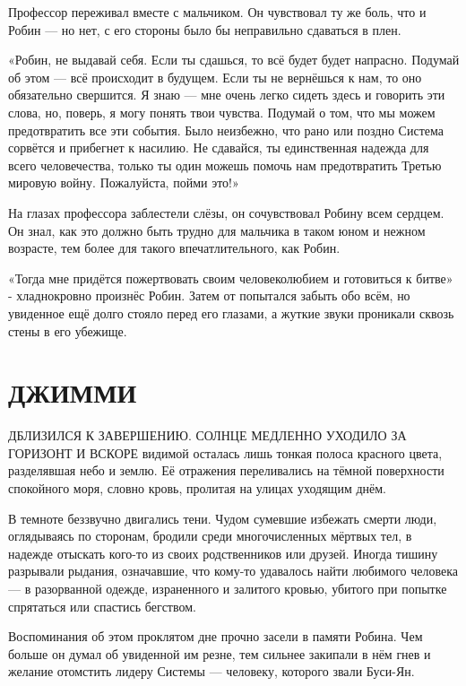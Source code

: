 \documentclass[a5paper, 9pt,
final, openany, twoside=true]{memoir}
\begin{document}
Профессор переживал вместе с мальчиком. Он чувствовал ту же боль, что и Робин — но нет, с его стороны было бы неправильно сдаваться в плен.

«Робин, не выдавай себя. Если ты сдашься, то всё будет будет напрасно. Подумай об этом — всё происходит в будущем. Если ты не вернёшься к нам, то оно обязательно свершится. Я знаю — мне очень легко сидеть здесь и говорить эти слова, но, поверь, я могу понять твои чувства. Подумай о том, что мы можем предотвратить все эти события. Было неизбежно, что рано или поздно Система сорвётся и прибегнет к насилию. Не сдавайся, ты единственная надежда для всего человечества, только ты один можешь помочь нам предотвратить Третью мировую войну. Пожалуйста, пойми это!»

На глазах профессора заблестели слёзы, он сочувствовал Робину всем сердцем. Он знал, как это должно быть трудно для мальчика в таком юном и нежном возрасте, тем более для такого впечатлительного, как Робин.\bigskip

«Тогда мне придётся пожертвовать своим человеколюбием и готовиться к битве» - хладнокровно произнёс Робин. Затем от попытался забыть обо всём, но увиденное ещё долго стояло перед его глазами, а жуткие звуки проникали сквозь стены в его убежище.

\chapter{ДЖИММИ}
Д{ БЛИЗИЛСЯ К ЗАВЕРШЕНИЮ. СОЛНЦЕ МЕДЛЕННО УХОДИЛО ЗА ГОРИЗОНТ И ВСКОРЕ} видимой осталась лишь тонкая полоса красного цвета, разделявшая небо и землю. Её отражения переливались на тёмной поверхности спокойного моря, словно кровь, пролитая на улицах уходящим днём.

В темноте беззвучно двигались тени. Чудом сумевшие избежать смерти люди, оглядываясь по сторонам, бродили среди многочисленных мёртвых тел, в надежде отыскать кого-то из своих родственников или друзей. Иногда тишину разрывали рыдания, означавшие, что кому-то удавалось найти любимого человека — в разорванной одежде, израненного и залитого кровью, убитого при попытке спрятаться или спастись бегством.

Воспоминания об этом проклятом дне прочно засели в памяти Робина. Чем больше он думал об увиденной им резне, тем сильнее закипали в нём гнев и желание отомстить лидеру Системы — человеку, которого звали Буси-Ян.
\end{document}
